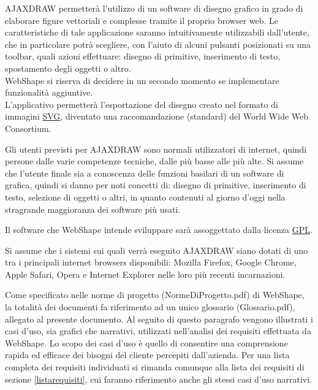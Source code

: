 AJAXDRAW permetter\`a l'utilizzo di un software di disegno grafico in grado di elaborare figure vettoriali e complesse tramite il proprio browser web. Le caratteristiche di tale applicazione saranno intuitivamente utilizzabili dall'utente, che in particolare potr\`a scegliere, con l'aiuto di alcuni pulsanti posizionati su una toolbar, quali azioni effettuare: disegno di primitive, inserimento di testo, spostamento degli oggetti o altro.\\
WebShape si riserva di decidere in un secondo momento se implementare funzionalit\`a aggiuntive.\\%
L'applicativo permetter\`a l'esportazione del disegno creato nel formato di immagini \underline{SVG}, diventato una raccomandazione (standard) del World Wide Web Consortium.

\label{definizione_utente}
Gli utenti previsti per AJAXDRAW sono normali utilizzatori di internet, quindi persone dalle varie competenze tecniche, dalle pi\`u basse alle pi\`u alte. Si assume che l'utente finale sia a conoscenza delle funzioni basilari di un software di grafica, quindi si danno per noti concetti di: disegno di primitive, inserimento di testo, selezione di oggetti o altri, in quanto contenuti al giorno d'oggi nella stragrande maggioranza dei software pi\`u usati.

Il software che WebShape intende sviluppare sar\`a assoggettato dalla licenza \underline{GPL}.

Si assume che i sistemi sui quali verr\`a eseguito AJAXDRAW siano dotati di uno tra i principali internet browsers disponibili: Mozilla Firefox, Google Chrome, Apple Safari, Opera e Internet Explorer nelle loro pi\`u recenti incarnazioni.

Come specificato nelle norme di progetto (NormeDiProgetto.pdf) di WebShape, la totalit\` a dei documenti fa riferimento ad un unico glossario (Glossario.pdf), allegato al presente documento.
\newpage
{}
Al seguito di questo paragrafo vengono illustrati i casi d'uso, sia grafici che narrativi, utilizzati nell'analisi dei requisiti effettuata da WebShape. Lo scopo dei casi d'uso \`e quello di consentire una comprensione rapida ed efficace dei bisogni del cliente percepiti dall'azienda. Per una lista completa dei requisiti individuati si rimanda comunque alla lista dei requisiti di sezione \ref{listarequisiti}, cui faranno riferimento anche gli stessi casi d'uso narrativi.

